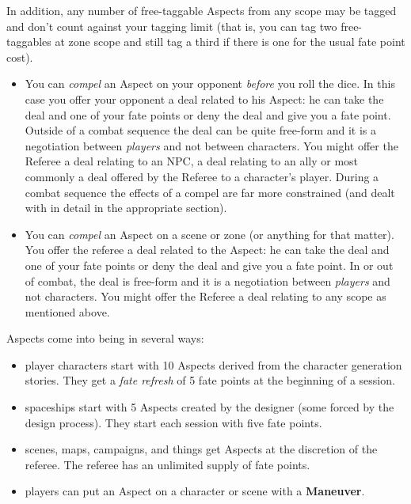 In addition, any number of free-taggable Aspects from any scope may be tagged and don't count against your tagging limit (that is, you can tag two free-taggables at zone scope and still tag a third if there is one for the usual fate point cost).

\begin{itemize}
\item You can \emph{compel} an Aspect on your opponent \emph{before} you roll the dice. In this case you offer your opponent a deal related to his Aspect: he can take the deal and one of your fate points or deny the deal and give you a fate point. Outside of a combat sequence the deal can be quite free-form and it is a negotiation between \emph{players} and not between characters. You might offer the Referee a deal relating to an NPC, a deal relating to an ally or most commonly a deal offered by the Referee to a character's player. During a combat sequence the effects of a compel are far more constrained (and dealt with in detail in the appropriate section).

\item You can \emph{compel} an Aspect on a scene or zone (or anything for that matter). You offer the referee a deal related to the Aspect: he can take the deal and one of your fate points or deny the deal and give you a fate point. In or out of combat, the deal is free-form and it is a negotiation between \emph{players} and not characters. You might offer the Referee a deal relating to any scope as mentioned above.
\end{itemize}

Aspects come into being in several ways:
\begin{itemize}
\item player characters start with 10 Aspects derived from the character generation stories. They get a \emph{fate refresh} of 5 fate points at the beginning of a session.

\item spaceships start with 5 Aspects created by the designer (some forced by the design process). They start each session with five fate points.

\item scenes, maps, campaigns, and things get Aspects at the discretion of the referee. The referee has an unlimited supply of fate points.

\item players can put an Aspect on a character or scene with a \textbf{Maneuver}.
\end{itemize}

